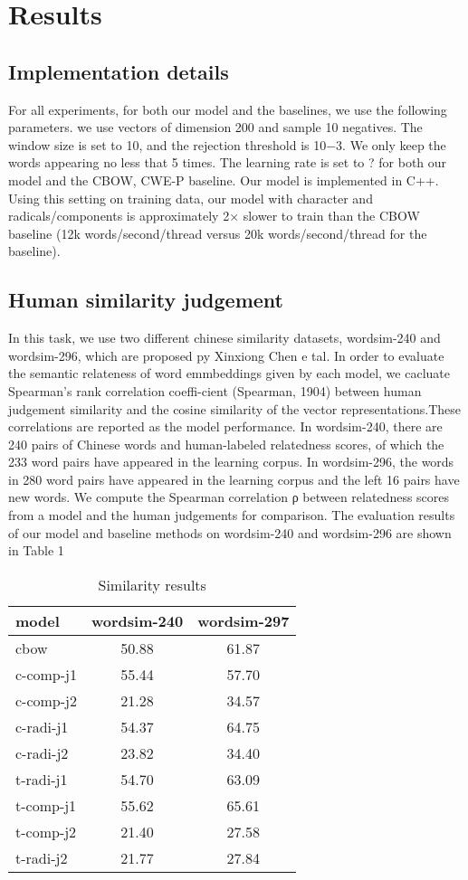 \section{Results}
\subsection{Implementation details}
For all experiments, for both our model and the baselines, we use the following parameters. we use vectors of dimension 200 and sample 10 negatives. The window size is set to 10, and the rejection threshold is 10−3. We only keep the words appearing no less that 5 times. The learning rate is set to ? for both our model and the CBOW, CWE-P baseline. Our model is implemented in C++.
Using this setting on training data, our model with character and radicals/components is approximately 2× slower to train than the CBOW baseline (12k words/second/thread versus 20k words/second/thread for the baseline). 

\subsection{Human similarity judgement} 
In this task, we use two different chinese similarity datasets, wordsim-240 and wordsim-296, which are proposed py Xinxiong Chen e tal. In order to evaluate the semantic relateness of word emmbeddings given by each model, we cacluate Spearman’s rank correlation coeffi-cient (Spearman, 1904) between human judgement similarity and the cosine similarity of the vector representations.These correlations are reported as the model performance. 
In wordsim-240, there are 240 pairs of Chinese words and human-labeled relatedness scores, of which the 233 word pairs have appeared in the learning corpus. In wordsim-296, the words in 280 word pairs have appeared in the learning corpus and the left 16 pairs have new words.
We compute the Spearman correlation ρ between relatedness scores from a model and the human judgements for comparison. The evaluation results of our model and baseline methods on wordsim-240 and wordsim-296 are shown in Table 1
\begin{table}[h]
\begin{center}
\begin{tabular}{lcc}
\hline \bf model & \bf wordsim-240 & \bf wordsim-297 \\ \hline
cbow & 50.88 & 61.87 \\
c-comp-j1\footnotemark[1] & 55.44 & 57.70\\
c-comp-j2 & 21.28 & 34.57 \\
c-radi-j1 & 54.37 & 64.75 \\
c-radi-j2 & 23.82  & 34.40\\
t-radi-j1  & 54.70 & 63.09\\
t-comp-j1  & 55.62 & 65.61\\
t-comp-j2 & 21.40 & 27.58\\
t-radi-j2 & 21.77 & 27.84\\
\hline
\end{tabular}
\end{center}
\caption{\label{font-table} Similarity results }
\end{table}

